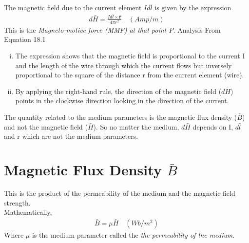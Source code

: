 The magnetic field due to the current element $Id\bar{l}$ is given by the expression
\begin{align}
\boxed{d\bar{H}= \frac{Id\bar{l} \times \hat{\textbf{r}}}{4\pi r^{2}}}\quad (Amp/m)
\end{align} 
This is the \emph{Magneto-motive force (MMF) at that point P}. Analysis From Equation 18.1
\begin{enumerate}[(i)]
\item The expression shows that the magnetic field is proportional to the current I and the length of the wire through which the current flows but inversely proportional to the square of the distance r from the current element (wire).
\item By applying the right-hand rule, the direction of the magnetic field ($d\bar{H}$) points in the clockwise direction looking in the direction of the current.
\end{enumerate}

The quantity related to the medium parameters is the magnetic flux density ($\bar{B}$) and not the magnetic field ($\bar{H}$). So no matter the medium, $ d\bar{H} $ depends on I, $ d\bar{l} $ and r which are not the medium parameters. 

\section{Magnetic Flux Density $\bar{B}$}
This is the product of the permeability of the medium and the magnetic field strength.\\
Mathematically, 
\begin{align}
\boxed{\bar{B} = \mu\bar{H}}\quad (Wb/m^{2})
\end{align}
Where $ \mu $ is the medium parameter called the \emph{the permeability of the medium}.

